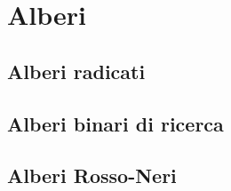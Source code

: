 \chapter{Alberi}

\section{Alberi radicati}

\section{Alberi binari di ricerca}

\section{Alberi Rosso-Neri}